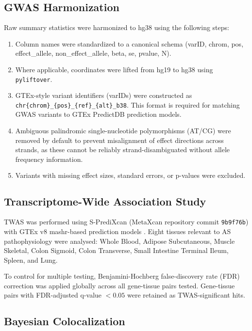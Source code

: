 \documentclass[12pt,a4paper]{article}
\begin{document}
\subsection{GWAS Harmonization}

Raw summary statistics were harmonized to hg38 using the following steps:
\begin{enumerate}
  \item Column names were standardized to a canonical schema
        (varID, chrom, pos, effect\_allele, non\_effect\_allele, beta, se, pvalue, N).
  \item Where applicable, coordinates were lifted from hg19 to hg38 using
        \texttt{pyliftover}.
  \item GTEx-style variant identifiers (varIDs) were constructed as
        \texttt{chr\{chrom\}\_\{pos\}\_\{ref\}\_\{alt\}\_b38}.
        This format is required for matching GWAS variants to GTEx
        PredictDB prediction models.
  \item Ambiguous palindromic single-nucleotide polymorphisms (AT/CG) were
        removed by default to prevent misalignment of effect directions across
        strands, as these cannot be reliably strand-disambiguated without
        allele frequency information.
  \item Variants with missing effect sizes, standard errors, or p-values were
        excluded.
\end{enumerate}

\subsection{Transcriptome-Wide Association Study}

TWAS was performed using S-PrediXcan (MetaXcan repository commit
\texttt{9b9f76b})
\citep{Barbeira2018} with GTEx v8 mashr-based prediction models
\citep{GTExConsortium2020,Barbeira2019}.
Eight tissues relevant to AS pathophysiology were analysed: Whole Blood,
Adipose Subcutaneous, Muscle Skeletal, Colon Sigmoid, Colon Transverse,
Small Intestine Terminal Ileum, Spleen, and Lung.

To control for multiple testing, Benjamini-Hochberg false-discovery rate
(FDR) correction was applied globally across all gene-tissue pairs tested.
Gene-tissue pairs with FDR-adjusted q-value $< 0.05$ were retained as
TWAS-significant hits.

\subsection{Bayesian Colocalization}
\end{document}
